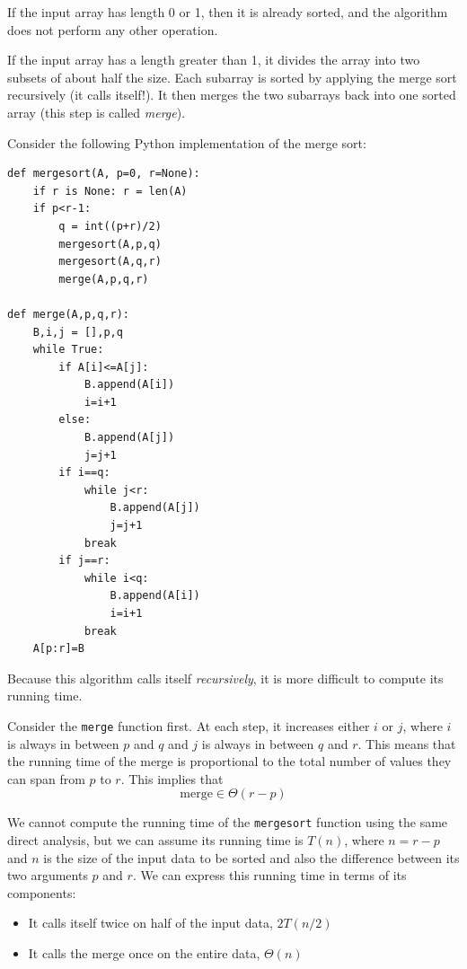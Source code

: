 \documentclass[justified,sixbynine]{tufte-book}
\def\ft{\small\tt}
\theoremstyle{plain}%
\theoremstyle{definition}
\theoremstyle{remark}
\begin{document}
\begin{fullwidth}
If the input array has length 0 or 1, then it is already sorted, and the algorithm does not perform any other operation.

If the input array has a length greater than 1, it divides the array into two subsets of about half the size. Each subarray is sorted by applying the merge sort recursively (it calls itself!). It then merges the two subarrays back into one sorted array (this step is called {\it merge}).

Consider the following Python implementation of the merge sort:

\begin{lstlisting}
def mergesort(A, p=0, r=None):
    if r is None: r = len(A)
    if p<r-1:
        q = int((p+r)/2)
        mergesort(A,p,q)
        mergesort(A,q,r)
        merge(A,p,q,r)

def merge(A,p,q,r):
    B,i,j = [],p,q
    while True:
        if A[i]<=A[j]:
            B.append(A[i])
            i=i+1
        else:
            B.append(A[j])
            j=j+1
        if i==q:
            while j<r:
                B.append(A[j])
                j=j+1
            break
        if j==r:
            while i<q:
                B.append(A[i])
                i=i+1
            break
    A[p:r]=B
\end{lstlisting}


Because this algorithm calls itself {\it recursively}, it is more difficult to compute its running time.

Consider the {\ft merge} function first. At each step, it increases either $i$ or $j$, where $i$ is always in between $p$ and $q$ and $j$ is always in between $q$ and $r$. This means that the running time of the merge is proportional to the total number of values they can span from $p$ to $r$. This implies that
\begin{equation}
\textrm{merge} \in \Theta(r-p)
\end{equation}

We cannot compute the running time of the {\ft mergesort} function using the same direct analysis, but we can assume its running time is $T(n)$, where $n=r-p$ and $n$ is the size of the input data to be sorted and also the difference between its two arguments $p$ and $r$. We can express this running time in terms of its components:
\begin{itemize}
\item It calls itself twice on half of the input data, $2T(n/2)$
\item It calls the merge once on the entire data, $\Theta(n)$
\end{itemize}


\end{fullwidth}
\end{document}
